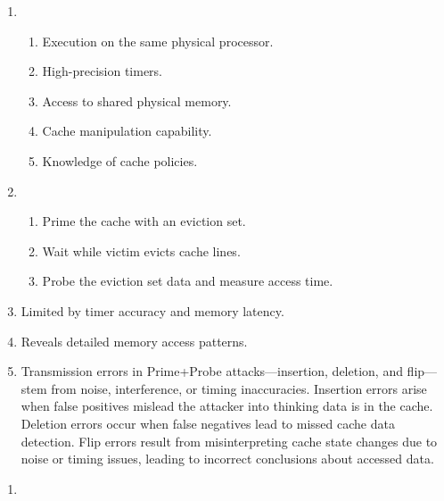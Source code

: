 \documentclass[sheet=2, prefix, english]{dexercise}
\begin{document}
\begin{enumerate}
  \item 
  \begin{enumerate}
  \item Execution on the same physical processor.
  \item High-precision timers.
  \item Access to shared physical memory.
  \item Cache manipulation capability.
  \item Knowledge of cache policies.
  \end{enumerate}
  \item 
    \begin{enumerate}
      \item Prime the cache with an eviction set.
      \item Wait while victim evicts cache lines.
      \item Probe the eviction set data and measure access time.
    \end{enumerate}
  \item Limited by timer accuracy and memory latency.
  \item Reveals detailed memory access patterns.
  \item Transmission errors in Prime+Probe attacks—insertion, deletion, and flip—stem from noise, interference, or timing inaccuracies. Insertion errors arise when false positives mislead the attacker into thinking data is in the cache. Deletion errors occur when false negatives lead to missed cache data detection. Flip errors result from misinterpreting cache state changes due to noise or timing issues, leading to incorrect conclusions about accessed data.
\end{enumerate}


\begin{enumerate}
  \item
\end{enumerate}
\end{document}
